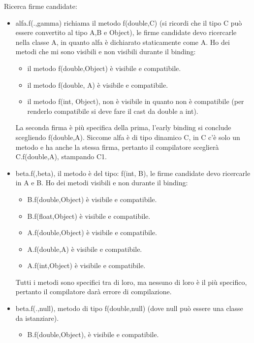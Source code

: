     Ricerca firme candidate:
    \begin{itemize}
        \item alfa.f(\3.\0,gamma) richiama il metodo f(double,C) (si ricordi che il tipo C può essere 
        convertito al tipo A,B e Object), le firme candidate devo ricercarle nella classe A, in quanto alfa
        è dichiarato staticamente come A.
        Ho dei metodi che mi sono visibili e non visibili durante il binding:
        \begin{itemize}
            \item il metodo f(double,Object) è visibile e compatibile.
            \item il metodo f(double, A) è visibile e compatibile.
            \item il metodo f(int, Object), non è visibile in quanto non è compatibile (per renderlo
            compatibile si deve fare il cast da double a int).
        \end{itemize} 
        La seconda firma è più specifica della prima, l'early binding si conclude scegliendo f(double,A).
        Siccome alfa è di tipo dinamico C, in C c'è solo un metodo e ha anche la stessa firma, pertanto
        il compilatore sceglierà C.f(double,A), stampando C1.
        \item beta.f(\3,beta), il metodo è del tipo: f(int, B), le firme candidate devo ricercarle in A e B.
        Ho dei metodi visibili e non durante il binding:
        \begin{itemize}
            \item B.f(double,Object) è visibile e compatibile.
            \item B.f(float,Object) è visibile e compatibile.
            \item A.f(double,Object) è visibile e compatibile.
            \item A.f(double,A) è visibile e compatibile.
            \item A.f(int,Object) è visibile e compatibile.
        \end{itemize}
        Tutti i metodi sono specifici tra di loro, ma nessuno di loro è il più specifico, pertanto il 
        compilatore darà errore di compilazione.
        \item beta.f(\3.\0,null), metodo di tipo f(double,null) (dove null può essere una classe da 
        istanziare).
        \begin{itemize}
            \item B.f(double,Object), è visibile e compatibile.

\end{itemize}
\end{itemize}
